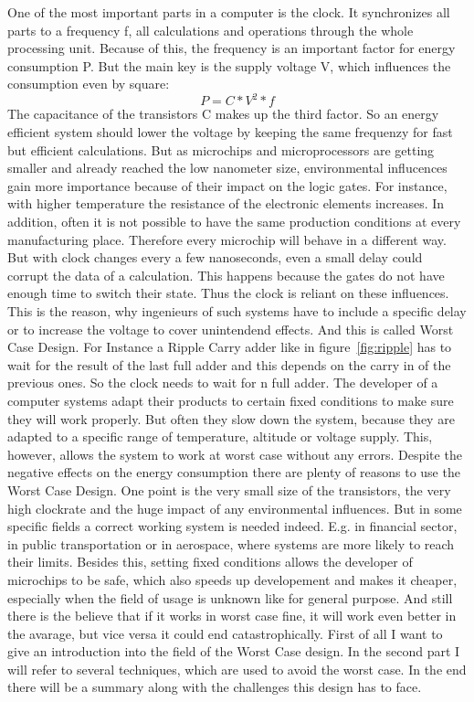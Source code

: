 \documentclass[12pt, a4paper]{article}
\begin{document}
	One of the most important parts in a computer is the clock. It synchronizes all parts to a frequency f, all calculations and operations through the whole processing unit. Because of this, the frequency is an important factor for energy consumption P. But the main key is the supply voltage V, which influences the consumption even by square: 
	\begin{equation}
		P = C * V^2 * f
	\end{equation}
	The capacitance of the transistors C makes up the third factor.\cite{pform} 
	So an energy efficient system should lower the voltage by keeping the same frequenzy for fast but efficient calculations.  
	\newline
	But as microchips and microprocessors are getting smaller and already reached the low nanometer size, environmental influcences gain more importance because of their impact on the logic gates. For instance, with higher temperature the resistance of the electronic elements increases. In addition, often it is not possible to have the same production conditions at every manufacturing place. Therefore every microchip will behave in a different way. But with clock changes every a few nanoseconds, even a small delay could corrupt the data of a calculation. This happens because the gates do not have enough time to switch their state.
	Thus the clock is reliant on these influences.
	This is the reason, why ingenieurs of such systems have to include a specific delay or to increase the voltage to cover unintendend effects. And this is called Worst Case Design.\cite{tea} 
	For Instance a Ripple Carry adder like in figure~\ref{fig:ripple} has to wait for the result of the last full adder and this depends on the carry in of the previous ones. So the clock needs to wait for n full adder. 
	\newline
	The developer of a computer systems adapt their products to certain fixed conditions to make sure they will work properly. But often they slow down the system, because they are adapted to a specific range of temperature, altitude or voltage supply. This, however, allows the system to work at worst case without any errors.
	\newline
	Despite the negative effects on the energy consumption there are plenty of reasons to use the Worst Case Design. One point is the very small size of the transistors, the very high clockrate and the huge impact of any environmental influences. But in some specific fields a correct working system is needed indeed. E.g. in financial sector, in public transportation or in aerospace, where systems are more likely to reach their limits. 
	Besides this, setting fixed conditions allows the developer of microchips to be safe, which also speeds up developement and makes it cheaper, especially when the field of usage is unknown like for general purpose. And still there is the believe that if it works in worst case fine, it will work even better in the avarage, but vice versa it could end catastrophically.\cite{net}
	\newline
	First of all I want to give an introduction into the field of the Worst Case design. In the second part I will refer to several techniques, which are used to avoid the worst case. In the end there will be a summary along with the challenges this design has to face.
	\newpage
\end{document}
